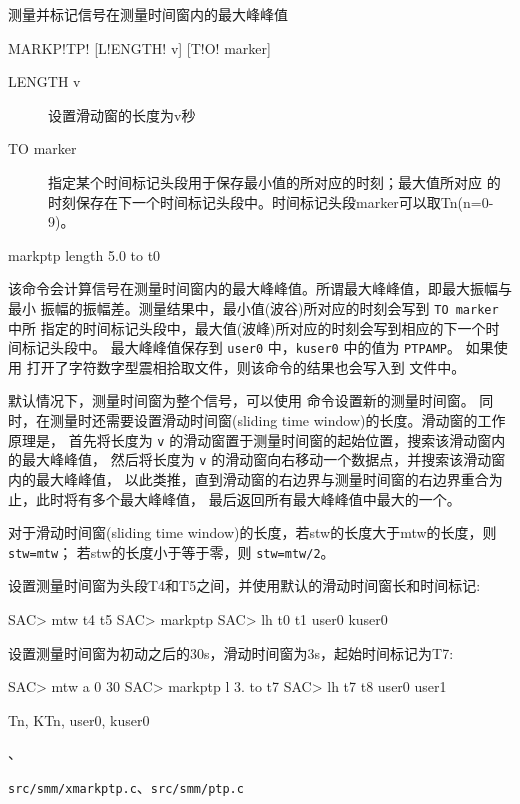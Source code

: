 \label{cmd:markptp}

测量并标记信号在测量时间窗内的最大峰峰值

\begin{SACSTX}
MARKP!TP! [L!ENGTH! v] [T!O! marker]
\end{SACSTX}

\begin{description}
\item [LENGTH v] 设置滑动窗的长度为v秒
\item [TO marker] 指定某个时间标记头段用于保存最小值的所对应的时刻；最大值所对应
    的时刻保存在下一个时间标记头段中。时间标记头段marker可以取Tn(n=0-9)。
\end{description}

\begin{SACDFT}
markptp length 5.0 to t0
\end{SACDFT}

该命令会计算信号在测量时间窗内的最大峰峰值。所谓最大峰峰值，即最大振幅与最小
振幅的振幅差。测量结果中，最小值(波谷)所对应的时刻会写到 \texttt{TO marker} 中所
指定的时间标记头段中，最大值(波峰)所对应的时刻会写到相应的下一个时间标记头段中。
最大峰峰值保存到 \texttt{user0} 中，\texttt{kuser0} 中的值为 \texttt{PTPAMP}。
如果使用  打开了字符数字型震相拾取文件，则该命令的结果也会写入到
文件中。

默认情况下，测量时间窗为整个信号，可以使用  命令设置新的测量时间窗。
同时，在测量时还需要设置滑动时间窗(sliding time window)的长度。滑动窗的工作原理是，
首先将长度为 \texttt{v} 的滑动窗置于测量时间窗的起始位置，搜索该滑动窗内的最大峰峰值，
然后将长度为 \texttt{v} 的滑动窗向右移动一个数据点，并搜索该滑动窗内的最大峰峰值，
以此类推，直到滑动窗的右边界与测量时间窗的右边界重合为止，此时将有多个最大峰峰值，
最后返回所有最大峰峰值中最大的一个。

对于滑动时间窗(sliding time window)的长度，若stw的长度大于mtw的长度，则 \texttt{stw=mtw}；
若stw的长度小于等于零，则 \texttt{stw=mtw/2}。

设置测量时间窗为头段T4和T5之间，并使用默认的滑动时间窗长和时间标记:
\begin{SACCode}
SAC> mtw t4 t5
SAC> markptp
SAC> lh t0 t1 user0 kuser0
\end{SACCode}

设置测量时间窗为初动之后的30s，滑动时间窗为3s，起始时间标记为T7:
\begin{SACCode}
SAC> mtw a 0 30
SAC> markptp l 3. to t7
SAC> lh t7 t8 user0 user1
\end{SACCode}

Tn, KTn, user0, kuser0

、

\texttt{src/smm/xmarkptp.c}、\texttt{src/smm/ptp.c}